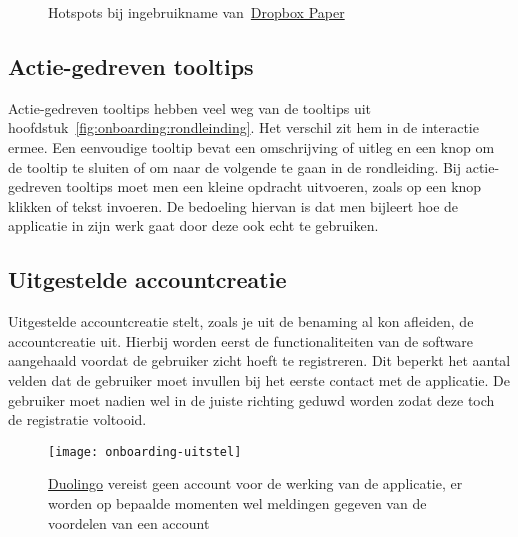 \begin{figure}[h!]
    \centering
    \qquad
    \caption[Voorbeeld hotspots]{Hotspots bij ingebruikname van~\href{https://www.dropbox.com/paper}{Dropbox Paper}}
    \label{fig:onboarding:hotspots}
\end{figure}

\subsection{Actie-gedreven tooltips}
\label{sec:onboarding:actie-tooltips}

Actie-gedreven tooltips hebben veel weg van de tooltips uit hoofdstuk~\ref{fig:onboarding:rondleinding}. Het verschil zit hem in de interactie ermee. Een eenvoudige tooltip bevat een omschrijving of uitleg en een knop om de tooltip te sluiten of om naar de volgende te gaan in de rondleiding. Bij actie-gedreven tooltips moet men een kleine opdracht uitvoeren, zoals op een knop klikken of tekst invoeren. De bedoeling hiervan is dat men bijleert hoe de applicatie in zijn werk gaat door deze ook echt te gebruiken.

\subsection{Uitgestelde accountcreatie}
\label{sec:onboarding:uitgestelde-accountcreatie}

Uitgestelde accountcreatie stelt, zoals je uit de benaming al kon afleiden, de accountcreatie uit. Hierbij worden eerst de functionaliteiten van de software aangehaald voordat de gebruiker zicht hoeft te registreren. Dit beperkt het aantal velden dat de gebruiker moet invullen bij het eerste contact met de applicatie. De gebruiker moet nadien wel in de juiste richting geduwd worden zodat deze toch de registratie voltooid.

\begin{figure}[h!]
    \centering
    \texttt{[image: onboarding-uitstel]}
    \caption[Voorbeeld uitgestelde accountcreatie]{\href{https://www.duolingo.com/}{Duolingo} vereist geen account voor de werking van de applicatie, er worden op bepaalde momenten wel meldingen gegeven van de voordelen van een account}
    \label{fig:onboarding:uitgestelde-accountcreatie}
\end{figure}

